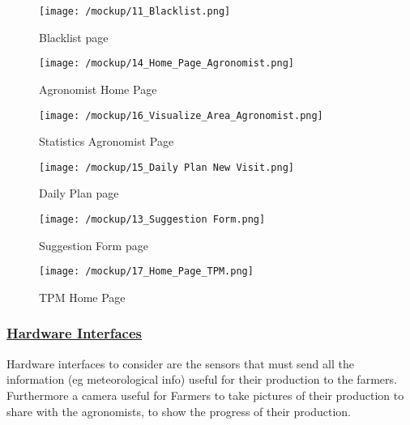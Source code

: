    \begin{figure}[ht!]
    	\centering
    	\begin{minipage}{0.75\textwidth}
    		\centering
    		\texttt{[image: /mockup/11\_Blacklist.png]}
    		\caption{Blacklist page}
    	\end{minipage} 
    \end{figure}

    \begin{figure}[ht!]
    	\centering
    	\begin{minipage}{0.5\textwidth}
    		\centering
    		\texttt{[image: /mockup/14\_Home\_Page\_Agronomist.png]}
    		\caption{Agronomist Home Page}
    	\end{minipage}\hfill
    	\begin{minipage}{0.5\textwidth}
    		\centering
    		\texttt{[image: /mockup/16\_Visualize\_Area\_Agronomist.png]}
    		\caption{Statistics Agronomist Page}
    	\end{minipage}
    \end{figure}

    \begin{figure}[ht!]
    	\centering
    	\begin{minipage}{0.75\textwidth}
    		\centering
    		\texttt{[image: /mockup/15\_Daily Plan New Visit.png]}
    		\caption{Daily Plan page}
    	\end{minipage} 
    \end{figure}

    \begin{figure}[ht!]
    	\centering
    	\begin{minipage}{0.75\textwidth}
    		\centering
    		\texttt{[image: /mockup/13\_Suggestion Form.png]}
    		\caption{Suggestion Form page}
    	\end{minipage} 
    \end{figure}

    \begin{figure}[ht!]
    	\centering
    	\begin{minipage}{0.75\textwidth}
    		\centering
    		\texttt{[image: /mockup/17\_Home\_Page\_TPM.png]}
    		\caption{TPM Home Page}
    	\end{minipage} 
    \end{figure}
    
	\FloatBarrier
	
	\subsubsection[Hardware Interfaces]{\hyperlink{toc}{Hardware Interfaces}}
	Hardware interfaces to consider are the sensors that must send all the information (eg meteorological info) useful for their production to the farmers. Furthermore a camera useful for Farmers to take pictures of their production to share with the agronomists, to show the progress of their production. 
		
